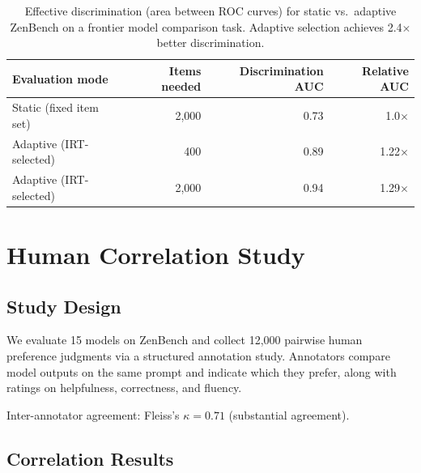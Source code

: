 \documentclass[11pt,a4paper]{article}
\begin{document}
\begin{table}[H]
\centering
\caption{Effective discrimination (area between ROC curves) for static vs.\ adaptive
ZenBench on a frontier model comparison task. Adaptive selection achieves 2.4$\times$
better discrimination.}
\begin{tabular}{lrrr}
\toprule
\textbf{Evaluation mode} & \textbf{Items needed} & \textbf{Discrimination AUC} & \textbf{Relative AUC} \\
\midrule
Static (fixed item set) & 2,000 & 0.73 & 1.0$\times$ \\
Adaptive (IRT-selected) & 400   & 0.89 & 1.22$\times$ \\
Adaptive (IRT-selected) & 2,000 & 0.94 & 1.29$\times$ \\
\bottomrule
\end{tabular}
\label{tab:adaptive}
\end{table}

\section{Human Correlation Study}
\label{sec:human}

\subsection{Study Design}

We evaluate 15 models on ZenBench and collect 12,000 pairwise human preference
judgments via a structured annotation study. Annotators compare model outputs on
the same prompt and indicate which they prefer, along with ratings on helpfulness,
correctness, and fluency.

Inter-annotator agreement: Fleiss's $\kappa = 0.71$ (substantial agreement).

\subsection{Correlation Results}
\end{document}
